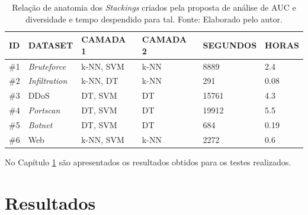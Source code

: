 \begin{description}
\begin{longtable}{l|l|l|l|l|l}
\caption{Relação de anatomia dos \textit{Stackings} criados pela proposta de análise de AUC e diversidade e tempo despendido para tal. Fonte: Elaborado pelo autor.}

\label{tab:tempo_criacao_camadas}

\hline


\textbf{ID}             & 
\textbf{DATASET}        & 
\textbf{CAMADA 1} 		& 
\textbf{CAMADA 2}       &
\textbf{SEGUNDOS}       &
\textbf{HORAS} \\ \hline \hline

\#1                      &
\textit{Bruteforce}     & 
k-NN, SVM               &
k-NN                    & 
8889                    & 
2.4                      \\ \hline

\#2                      &
\textit{Infiltration}     & 
k-NN, DT               &
k-NN                    & 
291                    & 
0.08                      \\ \hline

\#3                      &
DDoS     & 
DT, SVM               &
DT                   & 
15761                    & 
4.3                      \\ \hline

\#4                      &
\textit{Portscan}     & 
DT, SVM               &
DT                   & 
19912                    & 
5.5                      \\ \hline

\#5                      &
\textit{Botnet}     & 
DT, SVM               &
DT                   & 
684                    & 
0.19                      \\ \hline

\#6                      &
Web    & 
k-NN, SVM               &
k-NN                    & 
2272                    & 
0.6                      \\ \hline


\end{longtable}


\end{description}

No Capítulo \ref{result} são apresentados os resultados obtidos para os testes realizados.

\chapter{Resultados}
\label{result}



